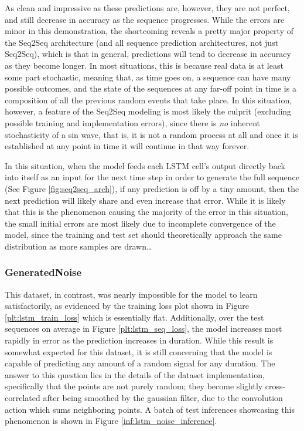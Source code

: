 \documentclass{scrartcl}
\begin{document}
As clean and impressive as these predictions are, however, they are not
perfect, and still decrease in accuracy as the sequence progresses. While the
errors are minor in this demonstration, the shortcoming reveals a pretty major
property of the Seq2Seq architecture (and all sequence prediction
architectures, not just Seq2Seq), which is that in general, predictions will
tend to decrease in accuracy as they become longer. In most situations, this is
because real data is at least some part stochastic, meaning that, as time goes
on, a sequence can have many possible outcomes, and the state of the sequences
at any far-off point in time is a composition of all the previous random events
that take place. In this situation, however, a feature of the Seq2Seq modeling
is most likely the culprit (excluding possible training and implementation
errors), since there is \textit{no} inherent stochasticity of a sin wave, that
is, it is not a random process at all and once it is established at any point
in time it will continue in that way forever. 

In this situation, when the model feeds each LSTM cell's output directly back
into itself as an input for the next time step in order to generate the full
sequence (See Figure \ref{fig:seq2seq_arch}), if any prediction is off by a
tiny amount, then the next prediction will likely share and even increase that
error. While it is likely that this is the phenomenon causing the majority of
the error in this situation, the small initial errors are most likely due to
incomplete convergence of the model, since the training and test set should
theoretically approach the same distribution as more samples are drawn\dots

\subsubsection{GeneratedNoise}
\label{subsubsec:generated_noise}

This dataset, in contrast, was nearly impossible for the model to learn
satisfactorily, as evidenced by the training loss plot shown in Figure
\ref{plt:lstm_train_loss} which is essentially flat. Additionally, over the
test sequences on average in Figure \ref{plt:lstm_seq_loss}, the model
increases most rapidly in error as the prediction increases in duration. While
this result is somewhat expected for this dataset, it is still concerning that
the model is capable of predicting any amount of a random signal for any
duration. The answer to this question lies in the details of the dataset
implementation, specifically that the points are not purely random; they become
slightly cross-correlated after being smoothed by the gaussian filter, due to
the convolution action which sums neighboring points. A batch of test
inferences showcasing this phenomenon is shown in Figure
\ref{inf:lstm_noise_inference}.
\end{document}
